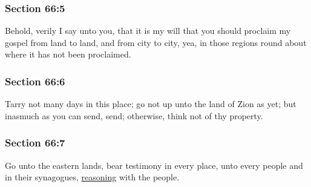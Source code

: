 	\subsubsection{Section 66:5} %
		\label{DC66-5}

		Behold, verily I say unto you, that it is my will that you should proclaim my gospel from land to land, and from city to city, yea, in those regions round about where it has not been proclaimed.


	\subsubsection{Section 66:6} %
		\label{DC66-6}

		Tarry not many days in this place; go not up unto the land of Zion as yet; but inasmuch as you can send, send; otherwise, think not of thy property.


	\subsubsection{Section 66:7} %
		\label{DC66-7}

		Go unto the eastern lands, bear testimony in every place, unto every people and in their synagogues, \hyperref[REASON]{reasoning} with the people.


